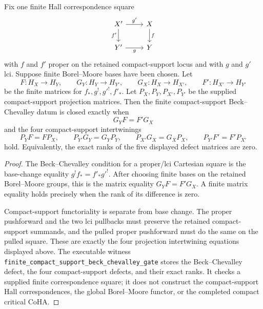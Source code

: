 \begin{proposition}
\label{prop:finite-compact-support-beck-chevalley-gate}
Fix one finite Hall correspondence square
\[
\begin{tikzcd}
 X' \arrow[r,"g'"] \arrow[d,"f'"'] & X \arrow[d,"f"]\\
 Y' \arrow[r,"g"'] & Y
\end{tikzcd}
\]
with \(f\) and \(f'\) proper on the retained compact-support locus and
with \(g\) and \(g'\) lci. Suppose finite Borel--Moore bases have been
chosen. Let
\[
 F\colon H_X\to H_Y,\qquad
 G_Y\colon H_Y\to H_{Y'},\qquad
 G_X\colon H_X\to H_{X'},\qquad
 F'\colon H_{X'}\to H_{Y'}
\]
be the finite matrices for \(f_*,g^!,g'^!,f'_*\). Let
\(P_X,P_Y,P_{X'},P_{Y'}\) be the supplied compact-support projection
matrices. Then the finite compact-support Beck--Chevalley datum is
closed exactly when
\[
 G_YF=F'G_X
\]
and the four compact-support intertwinings
\[
 P_YF=FP_X,\qquad
 P_{Y'}G_Y=G_YP_Y,\qquad
 P_{X'}G_X=G_XP_X,\qquad
 P_{Y'}F'=F'P_{X'}
\]
hold. Equivalently, the exact ranks of the five displayed defect
matrices are zero.
\end{proposition}

\begin{proof}
The Beck--Chevalley condition for a proper/lci Cartesian square is the
base-change equality \(g^!f_*=f'_*g'^!\). After choosing finite bases
on the retained Borel--Moore groups, this is the matrix equality
\(G_YF=F'G_X\). A finite matrix equality holds precisely when the
rank of its difference is zero.

Compact-support functoriality is separate from base change. The
proper pushforward and the two lci pullbacks must preserve the retained
compact-support summands, and the pulled proper pushforward must do the
same on the pulled square. These are exactly the four projection
intertwining equations displayed above. The executable witness
\texttt{finite\_compact\_support\_beck\_chevalley\_gate} stores the
Beck--Chevalley defect, the four compact-support defects, and their
exact ranks. It checks a supplied finite correspondence square; it does
not construct the compact-support Hall correspondences, the global
Borel--Moore functor, or the completed compact critical CoHA.
\end{proof}

